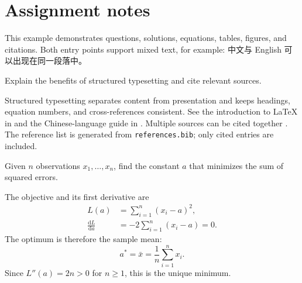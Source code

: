 \section*{Assignment notes}
This example demonstrates questions, solutions, equations, tables, figures,
and citations. Both entry points support mixed text, for example:
中文与 English 可以出现在同一段落中。

Explain the benefits of structured typesetting and cite relevant sources.
\begin{solution}
Structured typesetting separates content from presentation and keeps headings,
equation numbers, and cross-references consistent. See the introduction to
\LaTeX{} in \citep{lamport1994} and the Chinese-language guide in \citep{liu2013}.
Multiple sources can be cited together \citep{lamport1994,knuth1984}.
The reference list is generated from \texttt{references.bib}; only cited entries
are included.
\end{solution}

\label{sec:mean}
Given $n$ observations $x_1,\ldots,x_n$, find the constant $a$ that minimizes
the sum of squared errors.
\begin{solution}
The objective and its first derivative are
\begin{align}
  L(a) &= \sum_{i=1}^{n}(x_i-a)^2, \\
  \frac{\mathrm{d}L}{\mathrm{d}a} &= -2\sum_{i=1}^{n}(x_i-a)=0.
\end{align}
The optimum is therefore the sample mean:
\begin{equation}
  a^*=\bar{x}=\frac{1}{n}\sum_{i=1}^{n}x_i.
  \label{eq:mean}
\end{equation}
Since $L''(a)=2n>0$ for $n\geq1$, this is the unique minimum.
\end{solution}

